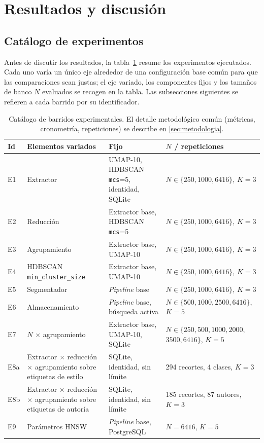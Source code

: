 \section{Resultados y discusión}
\label{sec:results}

\setlength{\emergencystretch}{6em}
\sloppy
\setlength{\tabcolsep}{4pt}

\subsection{Catálogo de experimentos}
\label{subsec:catalogo}
Antes de discutir los resultados, la tabla~\ref{tab:catalogo-experimentos}
resume los experimentos ejecutados. Cada uno varía un único eje alrededor de
una configuración base común para que las comparaciones sean justas; el eje
variado, los componentes fijos y los tamaños de banco $N$ evaluados se recogen
en la tabla. Las subsecciones siguientes se refieren a cada barrido por su
identificador.

\begin{table}[h]
\caption[Catálogo de barridos experimentales]{Catálogo de barridos experimentales. El detalle metodológico común
(métricas, cronometría, repeticiones) se describe en \ref{sec:metodologia}.}
\label{tab:catalogo-experimentos}
\centering
{\footnotesize
\begin{tabular}{|p{0.6cm}|p{3.5cm}|p{3.2cm}|p{3.4cm}|} \hline
  \textbf{Id} & \textbf{Elementos variados} & \textbf{Fijo} & \textbf{$N$ / repeticiones} \\ \hline
  E1 & Extractor & UMAP-10, HDBSCAN \texttt{mcs}=5, identidad, SQLite & $N\in\{250, 1000, 6416\}$, $K{=}3$ \\ \hline
  E2 & Reducción & Extractor base, HDBSCAN \texttt{mcs}=5 & $N\in\{250, 1000, 6416\}$, $K{=}3$ \\ \hline
  E3 & Agrupamiento & Extractor base, UMAP-10 & $N\in\{250, 1000, 6416\}$, $K{=}3$ \\ \hline
  E4 & HDBSCAN \texttt{min\_cluster\_size} & Extractor base, UMAP-10 & $N\in\{250, 1000, 6416\}$, $K{=}3$ \\ \hline
  E5 & Segmentador & \textit{Pipeline} base & $N\in\{250, 1000, 6416\}$, $K{=}3$ \\ \hline
  E6 & Almacenamiento & \textit{Pipeline} base, búsqueda activa & $N\in\{500, 1000, 2500, 6416\}$, $K{=}5$ \\ \hline
  E7 & $N$ $\times$ agrupamiento & Extractor base, UMAP-10, SQLite & $N\in\{250, 500, 1000, 2000,$ $3500, 6416\}$, $K{=}5$ \\ \hline
  E8a & Extractor $\times$ reducción $\times$ agrupamiento sobre etiquetas de estilo & SQLite, identidad, sin límite & 294 recortes, 4 clases, $K{=}3$ \\ \hline
  E8b & Extractor $\times$ reducción $\times$ agrupamiento sobre etiquetas de autoría & SQLite, identidad, sin límite & 185 recortes, 87 autores, $K{=}3$ \\ \hline
  E9 & Parámetros HNSW & \textit{Pipeline} base, PostgreSQL & $N{=}6416$, $K{=}5$ \\ \hline
\end{tabular}
}
\end{table}

